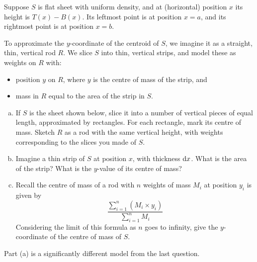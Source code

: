 \begin{question}\label{prob_s2.3:ybar}
Suppose  $S$ is flat sheet with uniform density,
and at (horizontal) position $x$ its height is $T(x)-B(x)$.
 Its leftmost point is at position $x=a$, and its rightmost point is at position $x=b$.

To approximate the $y$-coordinate of the centroid of $S$, we imagine it as a straight, thin, vertical rod $R$. We slice $S$ into thin, vertical strips, and model these as weights on $R$ with:
\begin{itemize}
\item position $y$ on $R$, where $y$ is the centre of mass of the strip, and
\item mass in $R$ equal to the area of the strip in $S$.
\end{itemize}
\begin{enumerate}[(a)]
\item If $S$ is the sheet shown below, slice it into a number of vertical pieces of equal length, approximated by rectangles. For each rectangle, mark its centre of mass. Sketch $R$ as a rod with the same vertical height, with weights corresponding to the slices you made of $S$.
\begin{center}
\end{center}
\item Imagine a thin strip of $S$ at position $x$, with thickness $\mathrm{d}x$. What is the area of the strip? What is the $y$-value of its centre of mass?
\item
Recall the centre of mass of a rod with $n$ weights of mass $M_i$ at position $y_i$ is given by
\[\frac{\sum\limits_{i=1}^n (M_i\times y_i) }{\sum\limits_{i=1}^n M_i}\]
Considering the limit of this formula as $n$ goes to infinity, give the $y$-coordinate of the centre of mass of $S$.
\end{enumerate}

\end{question}
\begin{hint}
Part (a) is a significantly different model from the last question.
\end{hint}

